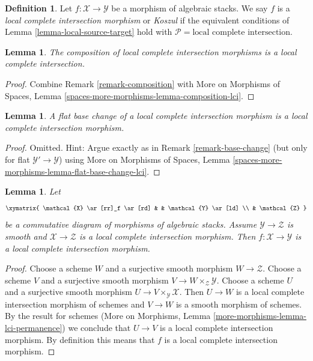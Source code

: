 \documentclass{stacks-project}
\theoremstyle{plain}
\newtheorem{lemma}[subsection]{Lemma}
\theoremstyle{definition}
\newtheorem{definition}[subsection]{Definition}
\theoremstyle{remark}
\numberwithin{equation}{subsection}
\begin{document}
\begin{definition}
\label{definition-lci}
Let $f : \mathcal{X} \to \mathcal{Y}$ be a morphism of algebraic stacks.
We say $f$ is a {\it local complete intersection morphism} or {\it Koszul}
if the equivalent conditions of
Lemma \ref{lemma-local-source-target}
hold with $\mathcal{P} = \text{local complete intersection}$.
\end{definition}

\begin{lemma}
\label{lemma-composition-lci}
The composition of local complete intersection morphisms is
a local complete intersection.
\end{lemma}

\begin{proof}
Combine
Remark \ref{remark-composition}
with
More on Morphisms of Spaces, Lemma
\ref{spaces-more-morphisms-lemma-composition-lci}.
\end{proof}

\begin{lemma}
\label{lemma-flat-base-change-lci}
A flat base change of a local complete intersection morphism is
a local complete intersection morphism.
\end{lemma}

\begin{proof}
Omitted. Hint: Argue exactly as in Remark \ref{remark-base-change}
(but only for flat $\mathcal{Y}' \to \mathcal{Y}$) using
More on Morphisms of Spaces, Lemma
\ref{spaces-more-morphisms-lemma-flat-base-change-lci}.
\end{proof}

\begin{lemma}
\label{lemma-lci-permanence}
Let
$$
\xymatrix{
\mathcal{X} \ar[rr]_f \ar[rd] & & \mathcal{Y} \ar[ld] \\
& \mathcal{Z}
}
$$
be a commutative diagram of morphisms of algebraic stacks.
Assume $\mathcal{Y} \to \mathcal{Z}$ is smooth and
$\mathcal{X} \to \mathcal{Z}$ is a local complete intersection morphism.
Then $f : \mathcal{X} \to \mathcal{Y}$ is a
local complete intersection morphism.
\end{lemma}

\begin{proof}
Choose a scheme $W$ and a surjective smooth morphism $W \to \mathcal{Z}$.
Choose a scheme $V$ and a surjective smooth morphism
$V \to W \times_\mathcal{Z} \mathcal{Y}$.
Choose a scheme $U$ and a surjective smooth morphism
$U \to V \times_\mathcal{Y} \mathcal{X}$.
Then $U \to W$ is a local complete intersection morphism of schemes and
$V \to W$ is a smooth morphism of schemes. By the result for schemes
(More on Morphisms, Lemma \ref{more-morphisms-lemma-lci-permanence})
we conclude that $U \to V$ is a local complete intersection morphism.
By definition this means that $f$ is a local complete intersection morphism.
\end{proof}
\end{document}
